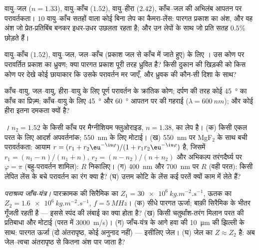 \begin{exercise}[$\star$]\label{exo:b2:wave-interfaces:2}
वायु--जल ($n = 1.33$), वायु--काँच ($1.52$), वायु--हीरा ($2.42$),
काँच--जल की अभिलंब आपतन पर परावर्तकता। $10$ वायु--काँच सतहों वाला
कोई बिना लेप का कैमरा-लेंस: पारगत प्रकाश का अंश, और वह अंश जो
प्रेत-प्रतिबिंब बनकर इधर-उधर उछलता रहता है; और उन लेपों के साथ जो प्रति सतह
$0.5\%$ छोड़ते हैं।
\end{exercise}

\begin{exercise}[$\star$]\label{exo:b2:wave-interfaces:3}
वायु--काँच ($1.52$), वायु--जल, जल--काँच (प्रकाश जल से काँच में जाते हुए)
के लिए । उस कोण पर परावर्तित प्रकाश का ध्रुवण; क्या
पारगत प्रकाश पूरी तरह ध्रुवित है? किसी दुकान की खिड़की को किस
कोण पर देखे कोई छायाकार कि उसके परावर्तन मर जाएँ, और ध्रुवक की
कौन-सी दिशा के साथ?
\end{exercise}

\begin{exercise}[$\star$]\label{exo:b2:wave-interfaces:4}
काँच--वायु, जल--वायु, हीरा--वायु के लिए पूर्ण परावर्तन के क्रांतिक कोण;
दर्पण की तरह कोई \qty{45}{\degree} का काँच का प्रिज़्म; काँच--वायु के लिए
\qty{45}{\degree} और \qty{60}{\degree} आपतन पर  की गहराई
($\lambda = \qty{600}{nm}$); और कोई हीरा इतना दमकता क्यों है?
\end{exercise}

\begin{exercise}[$\star\star$]\label{exo:b2:wave-interfaces:5}
\emph{।} $n_2 = 1.52$ के किसी काँच पर मैग्नीशियम
फ्लुओराइड, $n = 1.38$, का लेप है। (क) किसी एकल परत के लिए आदर्श अपवर्तनांक;
\qty{550}{nm} के लिए मोटाई। (ख) \qty{550}{nm} पर MgF$_2$ के साथ बची परावर्तकता:
आयाम $r = (r_1 + r_2\eu^{-\iu\varphi})/(1 + r_1r_2
\eu^{-\iu\varphi})$ है, जिसमें $r_1 = (n_1 - n)/(n_1 + n)$, $r_2 = (n - n_2)/(n + n_2)$
और अभिकल्प तरंगदैर्घ्य पर $\varphi = \pi$ (बहु-परावर्तन
शामिल): $R$ निकालिए। (ग) \qty{400}{nm} और \qty{700}{nm} पर $R$ (वही
परत): किसी लेपित लेंस के बचे परावर्तन का रंग क्या है?
(घ) उत्तम कोटि के लेंस कई परतें क्यों काम में लेते हैं?
\end{exercise}

\begin{exercise}[$\star\star$]\label{exo:b2:wave-interfaces:6}
\emph{पराश्रव्य जाँच-यंत्र।} पारक्रामक की सिरैमिक का $Z_1 = \qty{30e6}{kg.m^{-2}.s^{-1}}$,
ऊतक का $Z_2 = \qty{1.6e6}{kg.m^{-2}.s^{-1}}$, $f = \qty{5}{MHz}$। (क) सीधे
पारगत ऊर्जा; बाक़ी सिरैमिक के भीतर गूँजती रहती है --- इससे
स्पंद की लंबाई का क्या होता है? (ख) किसी चतुर्थांश-तरंग मिलान परत की
प्रतिबाधा और मोटाई (परत में  \qty{3000}{m/s})।
(ग) जाँच-यंत्र के आगे हवा की \qty{10}{\micro m} की झिल्ली के साथ: पारगत
ऊर्जा (दो अंतरापृष्ठ, कोई अनुनाद नहीं) --- इसीलिए जेल। (घ) जेल का
$Z \approx Z_2$ है: अब जेल--त्वचा अंतरापृष्ठ से कितना अंश पार जाता है?
\end{exercise}


